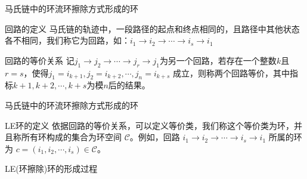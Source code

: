 \documentclass{beamer}
\begin{document}
\begin{frame}{马氏链中的环流}{环擦除方式形成的环}
	\begin{block}{回路的定义}
		马氏链的轨迹中，一段路径的起点和终点相同的，且路径中其他状态各不相同，我们称它为回路，如：$i_1 \to i_2 \to\cdots\to i_s \to i_1$
	\end{block}
	\begin{block}{回路的等价关系}
		记$j_1 \to j_2 \to\cdots\to j_r \to j_1$为另一个回路，若存在一个整数$k$且$r=s$，使得$j_1 = i_{k+1},j_2 = i_{k+2},\cdots,j_n = i_{k+s}$ 成立，则称两个回路等价，其中指标$k+1,k+2,\cdots,k+s$为模$n$后的结果。
	\end{block}
\end{frame}

\begin{frame}{马氏链中的环流}{环擦除方式形成的环}
	\begin{block}{LE环的定义}
		依据回路的等价关系，可以定义等价类，我们称这个等价类为环，并且称所有环构成的集合为环空间 $\mathcal{C}$。例如，回路 $i_1 \to i_2 \to\cdots\to i_s \to i_1$ 所属的环为 $c = (i_1,i_2,\cdots,i_s) \in \mathcal{C}$。
	\end{block}

	\begin{block}{LE(环擦除)环的形成过程}
		\begin{table}[htb!]
			\renewcommand \arraystretch{1} \centering
			\caption{导出链的变化过程和轨道中形成的环}\label{trajectory}
		\end{table}
	\end{block}
\end{frame}
\end{document}
